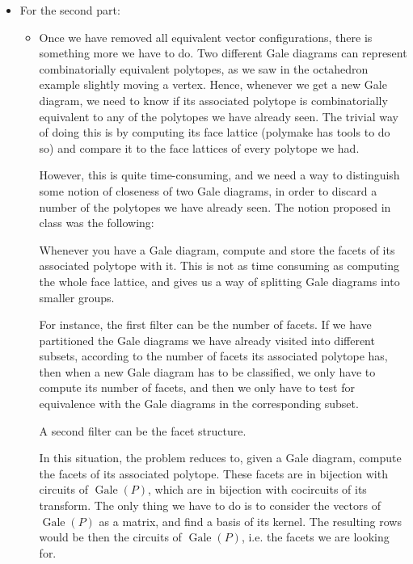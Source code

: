 \documentclass[11pt]{article}
\DeclareMathOperator{\Gale}{Gale}
\begin{document}
\begin{itemize}
  \item For the second part:
  
  \begin{itemize}
    \item Once we have removed all equivalent vector configurations, there is something more we have to do. Two different Gale diagrams can represent combinatorially equivalent polytopes, as we saw in the octahedron example slightly moving a vertex. Hence, whenever we get a new Gale diagram, we need to know if its associated polytope is combinatorially equivalent to any of the polytopes we have already seen. The trivial way of doing this is by computing its face lattice (polymake has tools to do so) and compare it to the face lattices of every polytope we had.

However, this is quite time-consuming, and we need a way to distinguish some notion of closeness of two Gale diagrams, in order to discard a number of the polytopes we have already seen. The notion proposed in class was the following:

Whenever you have a Gale diagram, compute and store the facets of its associated polytope with it. This is not as time consuming as computing the whole face lattice, and gives us a way of splitting Gale diagrams into smaller groups.

For instance, the first filter can be the number of facets. If we have partitioned the Gale diagrams we have already visited into different subsets, according to the number of facets its associated polytope has, then when a new Gale diagram has to be classified, we only have to compute its number of facets, and then we only have to test for equivalence with the Gale diagrams in the corresponding subset.

A second filter can be the facet structure.

In this situation, the problem reduces to, given a Gale diagram, compute the facets of its associated polytope. These facets are in bijection with circuits of $\Gale(P)$, which are in bijection with cocircuits of its transform. The only thing we have to do is to consider the vectors of $\Gale(P)$ as a matrix, and find a basis of its kernel. The resulting rows would be then the circuits of $\Gale(P)$, i.e. the facets we are looking for.
  \end{itemize}
\end{itemize}
\end{document}
